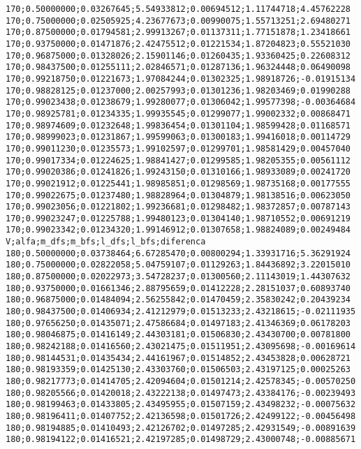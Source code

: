 \documentclass[brazil,times]{abnt}
\begin{document}
{\begin{verbatim}
170;0.50000000;0.03267645;5.54933812;0.00694512;1.11744718;4.45762228
170;0.75000000;0.02505925;4.23677673;0.00990075;1.55713251;2.69480271
170;0.87500000;0.01794581;2.99913267;0.01137311;1.77151878;1.23418661
170;0.93750000;0.01471876;2.42475512;0.01221534;1.87204823;0.55521030
170;0.96875000;0.01328026;2.15901146;0.01260435;1.93360425;0.22608312
170;0.98437500;0.01255111;2.02846571;0.01287136;1.96324448;0.06490098
170;0.99218750;0.01221673;1.97084244;0.01302325;1.98918726;-0.01915134
170;0.98828125;0.01237000;2.00257993;0.01301236;1.98203469;0.01990288
170;0.99023438;0.01238679;1.99280077;0.01306042;1.99577398;-0.00364684
170;0.98925781;0.01234335;1.99935545;0.01299077;1.99002332;0.00868471
170;0.98974609;0.01232648;1.99836454;0.01301104;1.98599428;0.01168571
170;0.98999023;0.01231867;1.99599063;0.01300183;1.99416018;0.00114729
170;0.99011230;0.01235573;1.99102597;0.01299701;1.98581429;0.00457040
170;0.99017334;0.01224625;1.98841427;0.01299585;1.98205355;0.00561112
170;0.99020386;0.01241826;1.99243150;0.01310166;1.98933089;0.00241720
170;0.99021912;0.01225441;1.98985851;0.01298569;1.98735168;0.00177555
170;0.99022675;0.01237480;1.98828964;0.01304879;1.98138516;0.00623050
170;0.99023056;0.01221802;1.99236681;0.01298482;1.98372857;0.00787143
170;0.99023247;0.01225788;1.99480123;0.01304140;1.98710552;0.00691219
170;0.99023342;0.01234320;1.99146912;0.01307658;1.98824089;0.00249484
V;alfa;m_dfs;m_bfs;l_dfs;l_bfs;diferenca
180;0.50000000;0.03738464;6.67285470;0.00800294;1.33931716;5.36291924
180;0.75000000;0.02822058;5.04759107;0.01129263;1.84436892;3.22015010
180;0.87500000;0.02022973;3.54728237;0.01300560;2.11143019;1.44307632
180;0.93750000;0.01661346;2.88795659;0.01412228;2.28151037;0.60893740
180;0.96875000;0.01484094;2.56255842;0.01470459;2.35830242;0.20439234
180;0.98437500;0.01406934;2.41212979;0.01513233;2.43218615;-0.02111935
180;0.97656250;0.01435071;2.47586684;0.01497183;2.41346369;0.06178203
180;0.98046875;0.01416149;2.44303181;0.01506830;2.43430700;0.00781800
180;0.98242188;0.01416560;2.43021475;0.01511951;2.43095698;-0.00169614
180;0.98144531;0.01435434;2.44161967;0.01514852;2.43453828;0.00628721
180;0.98193359;0.01425130;2.43303760;0.01506503;2.43197125;0.00025263
180;0.98217773;0.01414705;2.42094604;0.01501214;2.42578345;-0.00570250
180;0.98205566;0.01420018;2.43222138;0.01497473;2.43384176;-0.00239493
180;0.98199463;0.01433805;2.43495955;0.01507159;2.43498232;-0.00075632
180;0.98196411;0.01407752;2.42136598;0.01501726;2.42499122;-0.00456498
180;0.98194885;0.01410493;2.42126702;0.01497285;2.42931549;-0.00891639
180;0.98194122;0.01416521;2.42197285;0.01498729;2.43000748;-0.00885671

\end{verbatim}}
\end{document}
